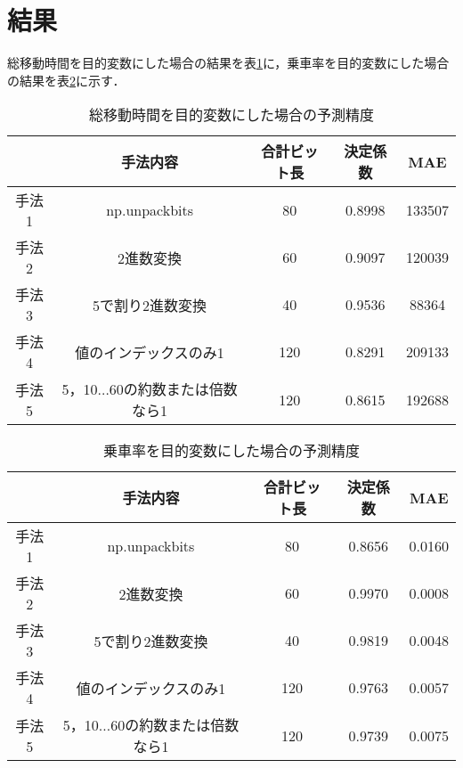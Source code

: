 \documentclass[main]{subfiles}
\begin{document}
    \section{結果}
    総移動時間を目的変数にした場合の結果を表\ref{bit_1}に，乗車率を目的変数にした場合の結果を表\ref{bit_2}に示す．
    \begin{table}[h]
        \centering
        \caption{総移動時間を目的変数にした場合の予測精度}
        \begin{tabular}{c|cccc}
           & 手法内容 & 合計ビット長 & 決定係数 & MAE \\ \hline
          手法1 & np.unpackbits & 80 & 0.8998 & 133507 \\
          手法2 & 2進数変換 & 60 & 0.9097 & 120039 \\
          手法3 & 5で割り2進数変換 & 40 & 0.9536 & 88364 \\
          手法4 & 値のインデックスのみ1 & 120 & 0.8291 & 209133 \\
          手法5 & 5，10$\dots$60の約数または倍数なら1 & 120 & 0.8615 & 192688 \\
        \end{tabular}
        \label{bit_1}
    \end{table}
    \begin{table}[h]
        \centering
        \caption{乗車率を目的変数にした場合の予測精度}
        \begin{tabular}{c|cccc}
           & 手法内容 & 合計ビット長 & 決定係数 & MAE \\ \hline
          手法1 & np.unpackbits & 80 & 0.8656 & 0.0160 \\
          手法2 & 2進数変換 & 60 & 0.9970 & 0.0008 \\
          手法3 & 5で割り2進数変換 & 40 & 0.9819 & 0.0048 \\
          手法4 & 値のインデックスのみ1 & 120 & 0.9763 & 0.0057 \\
          手法5 & 5，10$\dots$60の約数または倍数なら1 & 120 & 0.9739 & 0.0075 \\
        \end{tabular}
        \label{bit_2}
    \end{table}
\end{document}
